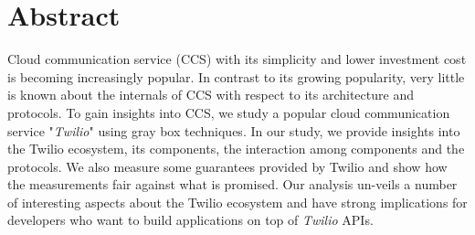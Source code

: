 \section{Abstract}
\label{sec-abstract}
Cloud communication service (CCS) with its simplicity and lower investment cost is becoming increasingly popular. In contrast to its growing popularity, very little is known about the internals of CCS with respect to its architecture and protocols. To gain insights into CCS, we study 
a popular cloud communication service "\textit{Twilio}" using gray box techniques. 
In our study, we  provide insights into the Twilio ecosystem, its components, the interaction among components and the protocols.
We also measure some guarantees 
provided by Twilio and show how the measurements fair against what is promised. Our analysis un-veils a number of interesting aspects about the Twilio ecosystem and have strong implications for developers who want to build applications on top of \textit{Twilio} APIs.
